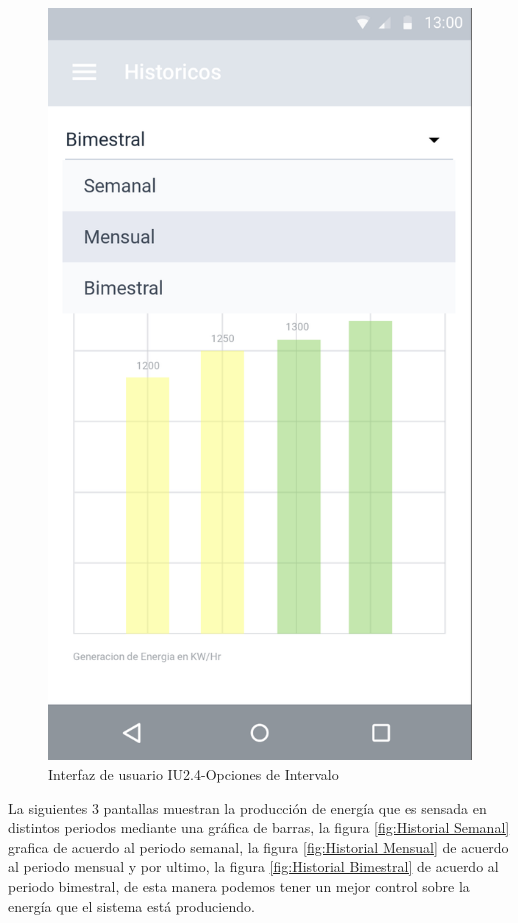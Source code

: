 \begin{figure}[H]
	\centering
	\includegraphics[scale=0.70]{Capitulo4/software/submodulos/images/opciones_hist.png}
	\caption{Interfaz de usuario IU2.4-Opciones de Intervalo}
	\label{fig:Opciones de Intervalo}
\end{figure}

La siguientes 3 pantallas muestran la producción de energía que es sensada en distintos periodos mediante una gráfica de barras, la figura \ref{fig:Historial Semanal} grafica de acuerdo al periodo semanal, la figura \ref{fig:Historial Mensual} de acuerdo al periodo mensual y por ultimo, la figura \ref{fig:Historial Bimestral} de acuerdo al periodo bimestral, de esta manera podemos tener un mejor control sobre la energía que el sistema está produciendo. 

